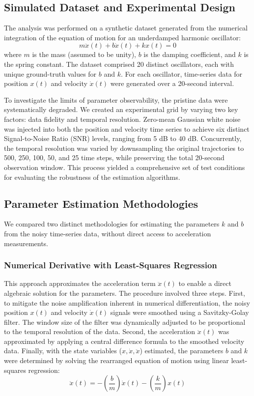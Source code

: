 \documentclass[]{article}
\begin{document}
\subsection{Simulated Dataset and Experimental Design}
The analysis was performed on a synthetic dataset generated from the numerical integration of the equation of motion for an underdamped harmonic oscillator:
\begin{equation}
m\ddot{x}(t) + b\dot{x}(t) + kx(t) = 0
\end{equation}
where $m$ is the mass (assumed to be unity), $b$ is the damping coefficient, and $k$ is the spring constant. The dataset comprised 20 distinct oscillators, each with unique ground-truth values for $b$ and $k$. For each oscillator, time-series data for position $x(t)$ and velocity $\dot{x}(t)$ were generated over a 20-second interval.

To investigate the limits of parameter observability, the pristine data were systematically degraded. We created an experimental grid by varying two key factors: data fidelity and temporal resolution. Zero-mean Gaussian white noise was injected into both the position and velocity time series to achieve six distinct Signal-to-Noise Ratio (SNR) levels, ranging from 5 dB to 40 dB. Concurrently, the temporal resolution was varied by downsampling the original trajectories to 500, 250, 100, 50, and 25 time steps, while preserving the total 20-second observation window. This process yielded a comprehensive set of test conditions for evaluating the robustness of the estimation algorithms.

\subsection{Parameter Estimation Methodologies}
We compared two distinct methodologies for estimating the parameters $k$ and $b$ from the noisy time-series data, without direct access to acceleration measurements.

\subsubsection{Numerical Derivative with Least-Squares Regression}
This approach approximates the acceleration term $\ddot{x}(t)$ to enable a direct algebraic solution for the parameters. The procedure involved three steps. First, to mitigate the noise amplification inherent in numerical differentiation, the noisy position $x(t)$ and velocity $\dot{x}(t)$ signals were smoothed using a Savitzky-Golay filter. The window size of the filter was dynamically adjusted to be proportional to the temporal resolution of the data. Second, the acceleration $\ddot{x}(t)$ was approximated by applying a central difference formula to the smoothed velocity data. Finally, with the state variables ($x, \dot{x}, \ddot{x}$) estimated, the parameters $b$ and $k$ were determined by solving the rearranged equation of motion using linear least-squares regression:
\begin{equation}
\ddot{x}(t) = - \left(\frac{b}{m}\right) \dot{x}(t) - \left(\frac{k}{m}\right) x(t)
\end{equation}
\end{document}
